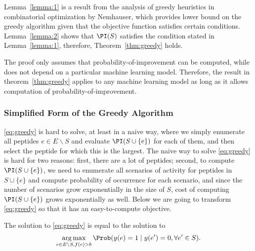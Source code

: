 Lemma~\ref{lemma:1} is a result from the analysis of greedy heuristics in combinatorial optimization by 
Nemhauser, which provides lower bound on the greedy algorithm given that the objective function 
satisfies certain conditions. Lemma~\ref{lemma:2} shows that $\PI(S)$ satisfies the condition stated in 
Lemma~\ref{lemma:1}, therefore, Theorem~\ref{thm:greedy} holds. 

The proof only assumes that probability-of-improvement can be computed, while does not depend on
a particular machine learning model. Therefore, the result in theorem~\ref{thm:greedy} applies to
any machine learning model as long as it allows computation of probability-of-improvement.

\subsubsection{Simplified Form of the Greedy Algorithm} \label{sec:reduced form}
\eqref{eq:greedy} is hard to solve, at least in a naive way, where we simply enumerate all peptides $e \in E \backslash S$ 
and evaluate $\PI (S \cup \{e\})$ for each of them, and then select the peptide for which this is the largest. The naive way
to solve \eqref{eq:greedy} is hard for two reasons: first, there are a lot of peptides; second, to compute $\PI (S \cup \{e\})$, 
we need to enumerate all scenarios of activity for peptides in $S \cup \{e\}$ and compute probability of occurrence for each scenario, 
and since the number of scenarios grow exponentially in the size of $S$, cost of computing $\PI (S \cup \{e\})$ grows exponentially
as well. Below we are going to transform \eqref{eq:greedy} so that it has an easy-to-compute objective.
\begin{proposition} \label{prop:reduced form}
  The solution to \eqref{eq:greedy} is equal to the solution to
  \begin{equation}
    \underset{e \in E \backslash S, f(e) > b}{\mathrm{arg}\max} \, \Prob (y(e)=1 \mid y(e') = 0, \forall e' \in S).
    \label{eq:reduced form}
  \end{equation}
\end{proposition}
